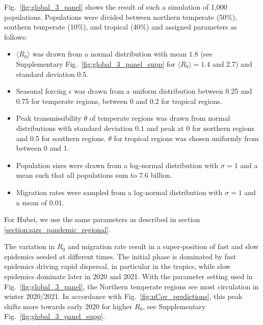 \documentclass[rmp, reprint, superscriptaddress, floatfix,amsmath]{revtex4-1}
\begin{document}
Fig.~\ref{fig:global_3_panel} shows the result of such a simulation of 1,000 populations.
Populations were divided between northern temperate (50\%), southern temperate (10\%), and tropical (40\%) and assigned parameters as follows:
\begin{itemize}
    \item $\langle R_0 \rangle$ was drawn from a normal distribution with mean $1.8$ (see Supplementary Fig.~\ref{fig:global_3_panel_supp} for $\langle R_0 \rangle=1.4$ and 2.7) and standard deviation $0.5$.
    \item Seasonal forcing $\epsilon$ was drawn from a uniform distribution between 0.25 and 0.75 for temperate regions, between 0 and 0.2 for tropical regions.
    \item Peak transmissibility $\theta$ of temperate regions was drawn from normal distributions with standard deviation $0.1$ and peak at $0$ for northern regions and 0.5 for southern regions. $\theta$ for tropical regions was chosen uniformly from between 0 and 1.  
    \item Population sizes were drawn from a log-normal distribution with $\sigma=1$ and a mean such that all populations sum to $7.6$ billion.
    \item Migration rates were sampled from a log-normal distribution with $\sigma=1$ and a mean of $0.01$.
\end{itemize}
For Hubei, we use the same parameters as described in section \ref{section:sars_pandemic_regional}.

The variation in $R_0$ and migration rate result in a super-position of fast and slow epidemics seeded at different times.
The initial phase is dominated by fast epidemics driving rapid dispersal, in particular in the tropics, while slow epidemics dominate later in 2020 and 2021.
With the parameter setting used in Fig.~\ref{fig:global_3_panel}, the Northern temperate regions see most circulation in winter 2020/2021. 
In accordance with Fig.~\ref{fig:nCov_predictions}, this peak shifts more towards early 2020 for higher $R_0$, see Supplementary Fig.~\ref{fig:global_3_panel_supp}.
\end{document}
